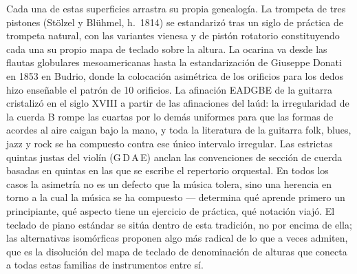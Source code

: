 \documentclass[10pt,letterpaper,twocolumn]{article}
\begin{document}
Cada una de estas superficies arrastra su propia genealogía. La trompeta de tres pistones (Stölzel y Blühmel, h.\ 1814) se estandarizó tras un siglo de práctica de trompeta natural, con las variantes vienesa y de pistón rotatorio constituyendo cada una su propio mapa de teclado sobre la altura. La ocarina va desde las flautas globulares mesoamericanas hasta la estandarización de Giuseppe Donati en 1853 en Budrio, donde la colocación asimétrica de los orificios para los dedos hizo enseñable el patrón de 10 orificios. La afinación EADGBE de la guitarra cristalizó en el siglo XVIII a partir de las afinaciones del laúd: la irregularidad de la cuerda B rompe las cuartas por lo demás uniformes para que las formas de acordes al aire caigan bajo la mano, y toda la literatura de la guitarra folk, blues, jazz y rock se ha compuesto contra ese único intervalo irregular. Las estrictas quintas justas del violín (G\,D\,A\,E) anclan las convenciones de sección de cuerda basadas en quintas en las que se escribe el repertorio orquestal. En todos los casos la asimetría no es un defecto que la música tolera, sino una herencia en torno a la cual la música se ha compuesto --- determina qué aprende primero un principiante, qué aspecto tiene un ejercicio de práctica, qué notación viajó. El teclado de piano estándar se sitúa dentro de esta tradición, no por encima de ella; las alternativas isomórficas proponen algo más radical de lo que a veces admiten, que es la disolución del mapa de teclado de denominación de alturas que conecta a todas estas familias de instrumentos entre sí.
\end{document}
